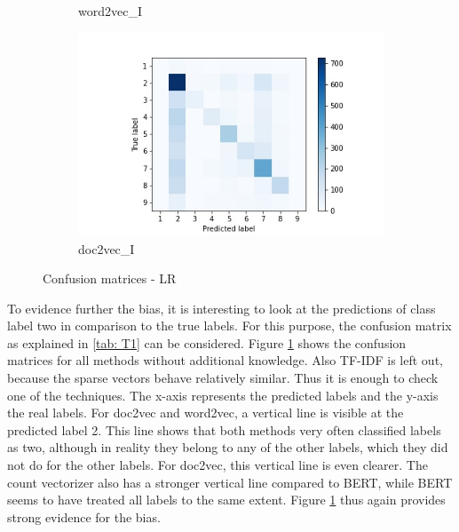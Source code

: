 \documentclass[12pt, a4paper, titlepage]{article}
\begin{document}
\begin{figure}
\begin{subfigure}[b]{0.475\textwidth}
    {{\small word2vec\_I}}    
  \end{subfigure}
  \hfill
  \begin{subfigure}[b]{0.475\textwidth}   
      \centering 
      \includegraphics[width=\textwidth]{cm_doc2vec_without_LR.jpg}
      {{\small doc2vec\_I}}    
  \end{subfigure}
  \caption{\label{fig: F17} Confusion matrices - \ac{LR}}
\end{figure}

To evidence further the bias, it is interesting to look at the predictions of class label two in comparison to the true labels. For this purpose, the confusion matrix as explained in \ref{tab: T1} can be considered. Figure \ref{fig: F17} shows the confusion matrices for all methods without additional knowledge. Also \ac{TF-IDF} is left out, because the sparse vectors behave relatively similar. Thus it is enough to check one of the techniques. The x-axis represents the predicted labels and the y-axis the real labels. For doc2vec and word2vec, a vertical line is visible at the predicted label 2. This line shows that both methods very often classified labels as two, although in reality they belong to any of the other labels, which they did not do for the other labels. For doc2vec, this vertical line is even clearer. The count vectorizer also has a stronger vertical line compared to BERT, while BERT seems to have treated all labels to the same extent. Figure \ref{fig: F17} thus again provides strong evidence for the bias. 
\end{document}
